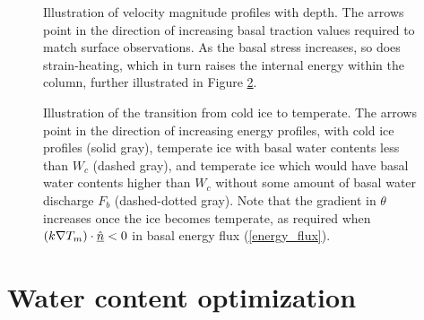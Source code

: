 
\begin{figure}
  \centering
    \def\svgwidth{\linewidth}
    
  \caption{Illustration of velocity magnitude profiles with depth.  The arrows point in the direction of increasing basal traction values required to match surface observations.  As the basal stress increases, so does strain-heating, which in turn raises the internal energy within the column, further illustrated in Figure \ref{temperate_zone_revised_image}.}
  \label{optimized_velocity_image}
\end{figure}

\begin{figure}
  \centering
    \def\svgwidth{\linewidth}
    
  \caption[Water-content optimization diagram]{Illustration of the transition from cold ice to temperate.  The arrows point in the direction of increasing energy profiles, with cold ice profiles ({\color[rgb]{0.39607843,0.39607843,0.39607843}solid gray}), temperate ice with basal water contents less than $W_c$ ({\color[rgb]{0.39607843,0.39607843,0.39607843}dashed gray}), and temperate ice which would have basal water contents higher than $W_c$ without some amount of basal water discharge $F_b$ ({\color[rgb]{0.39607843,0.39607843,0.39607843}dashed-dotted gray}).  Note that the gradient in $\theta$ increases once the ice becomes temperate, as required when $(k \nabla T_m) \cdot \underline{\hat{n}} < 0$ in basal energy flux (\ref{energy_flux}).}
  \label{temperate_zone_revised_image}
\end{figure}

\section{Water content optimization} \label{ssn_water_content_optimization}

